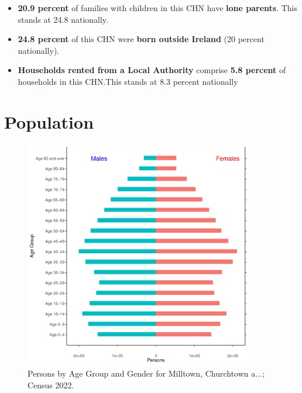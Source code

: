 \documentclass{article}
\begin{document}
\begin{itemize}
\item \textbf{20.9 percent} of families with children in this CHN have \textbf{lone parents}. This stands at 24.8 nationally.

\item \textbf{24.8 percent} of this CHN were \textbf{born outside Ireland} (20 percent nationally).

\item \textbf{Households rented from a Local Authority} comprise \textbf{5.8 percent} of households in this CHN.This stands at 8.3 percent nationally

\end{itemize}

\pagebreak

\section{Population} 
\label{sect:Pop}

\begin{figure}[h]
	\centering
	\includegraphics[width = 100mm]{../figures/PyramidPlot.pdf}
	\caption{Persons by Age Group and Gender for Milltown, Churchtown a...; Census 2022.}
	\label{fig:2ae19629-1a6a-13a3-e055-000000000001}
	\end{figure}
\end{document}

